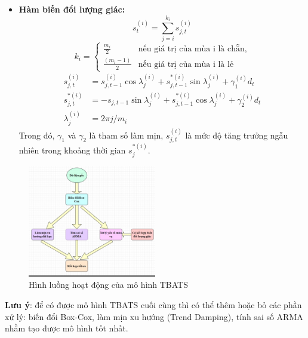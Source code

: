 \documentclass[conference]{IEEEtran}
\begin{document}
\begin{itemize}
    \item \textbf{Hàm biến đổi lượng giác:}
    \[
    s_t^{(i)} = \sum_{j=i}^{k_i} s_{j,t}^{(i)}
    \]
    \[
    k_i = 
    \begin{cases} 
    \frac{m_i}{2} & \text{nếu giá trị của mùa i là chẵn,} \\
    \frac{(m_i - 1)}{2} & \text{nếu giá trị của mùa i là lẻ}
    \end{cases}
    \]
    \begin{align*}
    s_{j,t}^{(i)} &= s_{j,t-1}^{(i)} \cos \lambda_j^{(i)} + s_{j,t-1}^{*(i)} \sin \lambda_j^{(i)} + \gamma_1^{(i)} d_t \\
    s_{j,t}^{*(i)} &= -s_{j,t-1} \sin \lambda_j^{(i)} + s_{j,t-1}^{*(i)} \cos \lambda_j^{(i)} + \gamma_2^{(i)} d_t \\
    \lambda_j^{(i)} &= 2\pi j / m_i
    \end{align*}
Trong đó, \( \gamma_1 \) và \( \gamma_2 \) là tham số làm mịn, \( s_{j,t}^{(i)} \) là mức độ tăng trưởng ngẫu nhiên trong khoảng thời gian \( s_j^{*(i)} \).


\end{itemize}





\begin{figure}[H]
    \centering
    \includegraphics[width=0.5\textwidth]{bibliography/Figure/tbats.png}
    \caption{Hình luồng hoạt động của mô hình TBATS}
    \label{fig:tbats_workflow}
\end{figure}

\textbf{Lưu ý}: để có được mô hình TBATS cuối cùng thì có thể thêm hoặc bỏ các phần xử lý: biến đổi Box-Cox, làm mịn xu hướng (Trend Damping), tính sai số ARMA nhằm tạo được mô hình tốt nhất.
\end{document}
